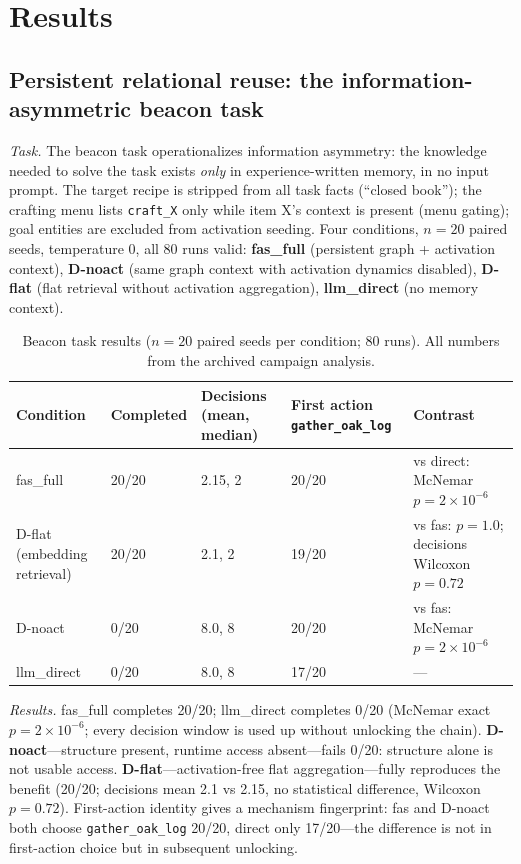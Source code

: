 \documentclass[10pt]{article}
\begin{document}
\section{Results}
\label{sec:results}

\subsection{Persistent relational reuse: the information-asymmetric beacon task}
\label{sec:res-reuse}

\emph{Task.} The beacon task operationalizes information asymmetry: the knowledge needed to solve the task exists \emph{only} in experience-written memory, in no input prompt. The target recipe is stripped from all task facts (``closed book''); the crafting menu lists \texttt{craft\_X} only while item X's context is present (menu gating); goal entities are excluded from activation seeding. Four conditions, $n{=}20$ paired seeds, temperature 0, all 80 runs valid: \textbf{fas\_full} (persistent graph + activation context), \textbf{D-noact} (same graph context with activation dynamics disabled), \textbf{D-flat} (flat retrieval without activation aggregation), \textbf{llm\_direct} (no memory context).

\begin{table}[t]
\centering\small
\caption{Beacon task results ($n{=}20$ paired seeds per condition; 80 runs). All numbers from the archived campaign analysis.}
\label{tab:beacon}
\begin{tabular}{L{2.6cm}L{2.2cm}L{3.4cm}L{3.4cm}L{2.6cm}}
\toprule
\textbf{Condition} & \textbf{Completed} & \textbf{Decisions (mean, median)} & \textbf{First action \texttt{gather\_oak\_log}} & \textbf{Contrast} \\
\midrule
fas\_full & 20/20 & 2.15, 2 & 20/20 & vs direct: McNemar $p{=}2\times10^{-6}$ \\
D-flat (embedding retrieval) & 20/20 & 2.1, 2 & 19/20 & vs fas: $p{=}1.0$; decisions Wilcoxon $p{=}0.72$ \\
D-noact & 0/20 & 8.0, 8 & 20/20 & vs fas: McNemar $p{=}2\times10^{-6}$ \\
llm\_direct & 0/20 & 8.0, 8 & 17/20 & --- \\
\bottomrule
\end{tabular}
\end{table}

\emph{Results.} fas\_full completes 20/20; llm\_direct completes 0/20 (McNemar exact $p{=}2\times10^{-6}$; every decision window is used up without unlocking the chain). \textbf{D-noact}---structure present, runtime access absent---fails 0/20: structure alone is not usable access. \textbf{D-flat}---activation-free flat aggregation---fully reproduces the benefit (20/20; decisions mean 2.1 vs 2.15, no statistical difference, Wilcoxon $p{=}0.72$). First-action identity gives a mechanism fingerprint: fas and D-noact both choose \texttt{gather\_oak\_log} 20/20, direct only 17/20---the difference is not in first-action choice but in subsequent unlocking.
\end{document}
